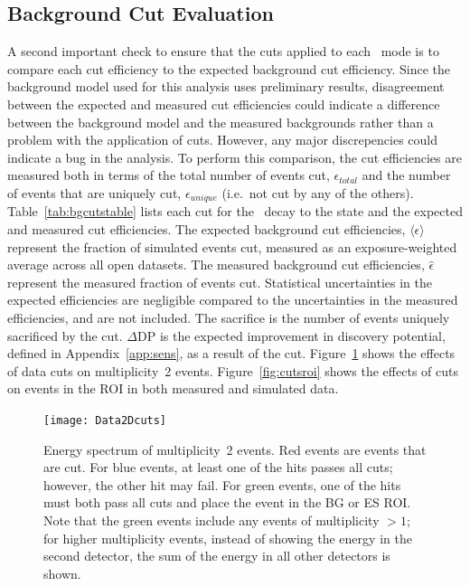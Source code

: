 \documentclass[/main.tex]{subfiles}
\begin{document}
\subsection{Background Cut Evaluation}
A second important check to ensure that the cuts applied to each \bbes\ mode is to compare each cut efficiency to the expected background cut efficiency.
Since the background model used for this analysis uses preliminary results, disagreement between the expected and measured cut efficiencies could indicate a difference between the background model and the measured backgrounds rather than a problem with the application of cuts.
However, any major discrepencies could indicate a bug in the analysis.
To perform this comparison, the cut efficiencies are measured both in terms of the total number of events cut, $\epsilon_{total}$ and the number of events that are uniquely cut, $\epsilon_{unique}$ (i.e.~not cut by any of the others).
Table~\ref{tab:bgcutstable} lists each cut for the \bbes\ decay to the  state and the expected and measured cut efficiencies.
The expected background cut efficiencies, $\langle\epsilon\rangle$ represent the fraction of simulated events cut, measured as an exposure-weighted average across all open datasets.
The measured background cut efficiencies, $\hat{\epsilon}$ represent the measured fraction of events cut.
Statistical uncertainties in the expected efficiencies are negligible compared to the uncertainties in the measured efficiencies, and are not included.
The sacrifice is the number of events uniquely sacrificed by the cut.
$\Delta \mathrm{DP}$ is the expected improvement in discovery potential, defined in Appendix~\ref{app:sens}, as a result of the cut.
Figure~\ref{fig:datacuts2D} shows the effects of data cuts on multiplicity~2 events.
Figure~\ref{fig:cutsroi} shows the effects of cuts on events in the ROI in both measured and simulated data.

\begin{figure}
  \centering
  \texttt{[image: Data2Dcuts]}
  \caption[Effect of data cuts on measured multiplicity 2 events]{\label{fig:datacuts2D}
    Energy spectrum of multiplicity~2 events. Red events are events that are cut. For blue events, at least one of the hits passes all cuts; however, the other hit may fail. For green events, one of the hits must both pass all cuts and place the event in the BG or ES ROI. Note that the green events include any events of multiplicity $>1$; for higher multiplicity events, instead of showing the energy in the second detector, the sum of the energy in all other detectors is shown.
  }
\end{figure}
\end{document}
